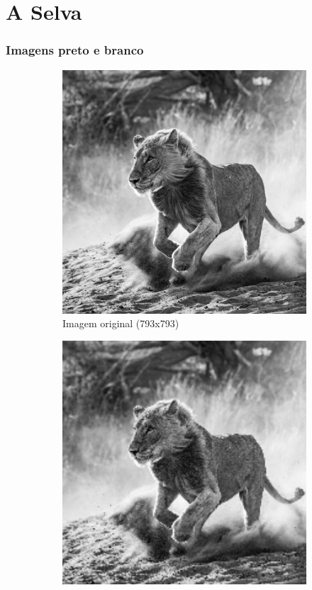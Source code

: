 \documentclass[leqno]{article}
\begin{document}
\section{A Selva}

\subsubsection*{Imagens preto e branco}

\begin{figure}[H]
    \centering
    \begin{subfigure}{.33\textwidth}
      \centering
      \includegraphics[width=.7\linewidth]{../images/leaopb.png}
      \caption{Imagem original (793x793) }
      \label{fig:sub1}
    \end{subfigure}%
    \begin{subfigure}{.33\textwidth}
      \centering
      \includegraphics[width=.7\linewidth]{../images/leaopb_bil.png}

\end{subfigure}
\end{figure}
\end{document}
